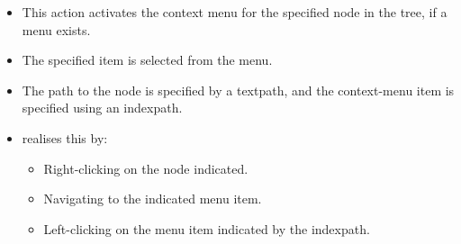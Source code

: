 
\begin{itemize}
\item This action activates the context menu for the specified node in the tree, if a menu exists.
\item The specified item is  selected from the menu.
\item The path to the node is specified by a textpath, and the context-menu item is specified using an indexpath.
\item \jb{} realises this by:
  \begin{itemize}
    \item Right-clicking on the node indicated.
    \item Navigating to the indicated menu item.
    \item Left-clicking on the menu item indicated by the indexpath.
  \end{itemize}
\end{itemize}
